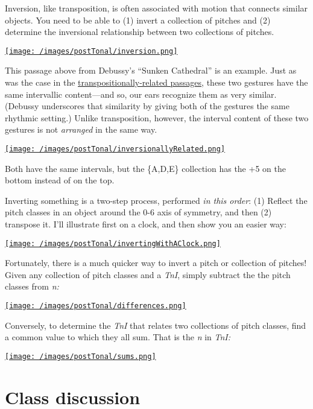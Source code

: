 \documentclass{book}
\begin{document}
Inversion, like transposition, is often associated with motion that connects
similar objects. You need to be able to (1) invert a collection of pitches and
(2) determine the inversional relationship between two collections of pitches.

\href{/images/postTonal/inversion.png}{\texttt{[image: /images/postTonal/inversion.png]}}

This passage above from Debussy's ``Sunken Cathedral'' is an example. Just as
was the case in the
\protect\hyperlink{transposition-1}{transpositionally-related passages}, these
two gestures have the same intervallic content---and so, our ears recognize
them as very similar. (Debussy underscores that similarity by giving both of
the gestures the same rhythmic setting.) Unlike transposition, however, the
interval content of these two gestures is not \emph{arranged} in the same way.

\href{/images/postTonal/inversionallyRelated.png}{\texttt{[image: /images/postTonal/inversionallyRelated.png]}}

Both have the same intervals, but the \{A,D,E\} collection has the +5 on the
bottom instead of on the top.

Inverting something is a two-step process, performed \emph{in this order}: (1)
Reflect the pitch classes in an object around the 0-6 axis of symmetry, and
then (2) transpose it. I'll illustrate first on a clock, and then show you an
easier way:

\href{/images/postTonal/invertingWithAClock.png}{\texttt{[image: /images/postTonal/invertingWithAClock.png]}}

Fortunately, there is a much quicker way to invert a pitch or collection of
pitches! Given any collection of pitch classes and a \emph{TnI}, simply
subtract the the pitch classes from \emph{n:}

\href{/images/postTonal/differences.png}{\texttt{[image: /images/postTonal/differences.png]}}

Conversely, to determine the \emph{TnI} that relates two collections of pitch
classes, find a common value to which they all sum. That is the \emph{n} in
\emph{TnI:}

\href{/images/postTonal/sums.png}{\texttt{[image: /images/postTonal/sums.png]}}

\hypertarget{class-discussion-40}{%
\chapter{Class discussion}\label{class-discussion-40}}
\end{document}
